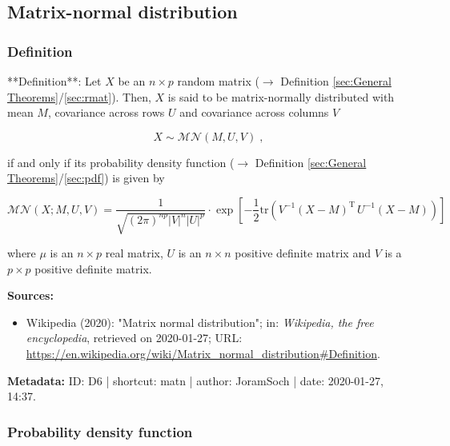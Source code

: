 \documentclass[a4paper,12pt,twoside]{book}
\begin{document}
\subsection{Matrix-normal distribution}

\subsubsection[\textit{Definition}]{Definition} \label{sec:matn}
\setcounter{equation}{0}

**Definition**: Let $X$ be an $n \times p$ random matrix ($\rightarrow$ Definition \ref{sec:General Theorems}/\ref{sec:rmat}). Then, $X$ is said to be matrix-normally distributed with mean $M$, covariance across rows $U$ and covariance across columns $V$

\begin{equation} \label{eq:matn-matn}
X \sim \mathcal{MN}(M, U, V) \; ,
\end{equation}

if and only if its probability density function ($\rightarrow$ Definition \ref{sec:General Theorems}/\ref{sec:pdf}) is given by

\begin{equation} \label{eq:matn-matn-pdf}
\mathcal{MN}(X; M, U, V) = \frac{1}{\sqrt{(2\pi)^{np} |V|^n |U|^p}} \cdot \exp\left[-\frac{1}{2} \mathrm{tr}\left( V^{-1} (X-M)^\mathrm{T} \, U^{-1} (X-M) \right) \right]
\end{equation}

where $\mu$ is an $n \times p$ real matrix, $U$ is an $n \times n$ positive definite matrix and $V$ is a $p \times p$ positive definite matrix.


\vspace{1em}
\textbf{Sources:}
\begin{itemize}
\item Wikipedia (2020): "Matrix normal distribution"; in: \textit{Wikipedia, the free encyclopedia}, retrieved on 2020-01-27; URL: \url{https://en.wikipedia.org/wiki/Matrix_normal_distribution#Definition}.
\end{itemize}


\vspace{1em}
\textbf{Metadata:} ID: D6 | shortcut: matn | author: JoramSoch | date: 2020-01-27, 14:37.
\vspace{1em}



\subsubsection[\textbf{Probability density function}]{Probability density function} \label{sec:matn-pdf}
\setcounter{equation}{0}
\end{document}
